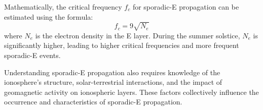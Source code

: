 Mathematically, the critical frequency \( f_c \) for sporadic-E propagation can be estimated using the formula:
\[
f_c = 9 \sqrt{N_e}
\]
where \( N_e \) is the electron density in the E layer. During the summer solstice, \( N_e \) is significantly higher, leading to higher critical frequencies and more frequent sporadic-E events.

Understanding sporadic-E propagation also requires knowledge of the ionosphere's structure, solar-terrestrial interactions, and the impact of geomagnetic activity on ionospheric layers. These factors collectively influence the occurrence and characteristics of sporadic-E propagation.

